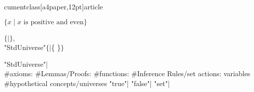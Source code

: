 
cumentclass[a4paper,12pt]{article}
\usepackage{amsmath, amsthm, amssymb, amsfonts}



$\{x \mid x \text{  is  positive  and  even}\}$

$\{ \mid \}$, \\
"StdUniverse"$\{\mid $\{ \}$ \}$

"StdUniverse"{| \\
\#axioms:
\#Lemmas/Proofs:
\#functions:
\#Inference Rules/set actions:
variables
\#hypothetical concepts/universes
"true"{|}
"false"{|}
"set"{|}
}
\iffalse
I don't want this to happen
\fi




